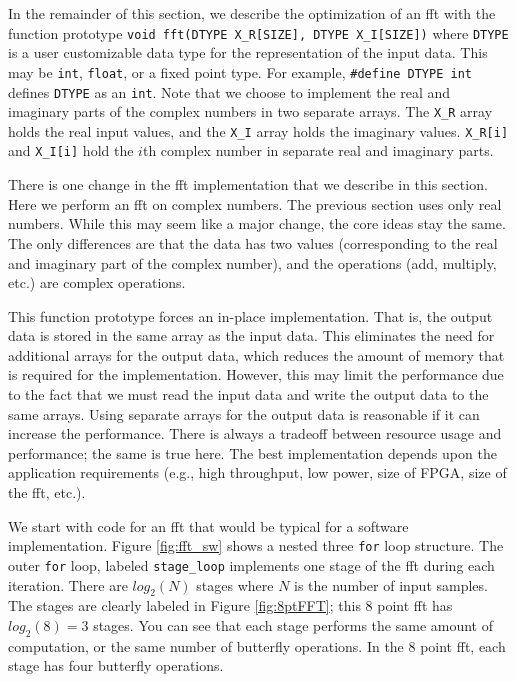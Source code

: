 In the remainder of this section, we describe the optimization of an \gls{fft} with the function prototype \lstinline|void fft(DTYPE X_R[SIZE], DTYPE X_I[SIZE])| where \lstinline|DTYPE| is a user customizable data type for the representation of the input data. This may be \lstinline|int|, \lstinline|float|, or a fixed point type. For example, \lstinline|#define DTYPE int| defines \lstinline|DTYPE| as an \lstinline|int|. Note that we choose to implement the real and imaginary parts of the complex numbers in two separate arrays. The \lstinline|X_R| array holds the real input values, and the \lstinline|X_I| array holds the imaginary values. \lstinline|X_R[i]| and \lstinline|X_I[i]| hold the $i$th complex number in separate real and imaginary parts. 

\begin{aside}
There is one change in the \gls{fft} implementation that we describe in this section. Here we perform an \gls{fft} on complex numbers. The previous section uses only real numbers. While this may seem like a major change, the core ideas stay the same. The only differences are that the data has two values (corresponding to the real and imaginary part of the complex number), and the operations (add, multiply, etc.) are complex operations. 
\end{aside}

This function prototype forces an in-place implementation. That is, the output data is stored in the same array as the input data. This eliminates the need for additional arrays for the output data, which reduces the amount of memory that is required for the implementation. However, this may limit the performance due to the fact that we must read the input data and write the output data to the same arrays. Using separate arrays for the output data is reasonable if it can increase the performance. There is always a tradeoff between resource usage and performance; the same is true here. The best implementation depends upon the application requirements (e.g., high throughput, low power, size of FPGA, size of the \gls{fft}, etc.).


We start with code for an \gls{fft} that would be typical for a software implementation. Figure \ref{fig:fft_sw} shows a nested three \lstinline|for| loop structure. The outer \lstinline|for| loop, labeled \lstinline|stage_loop| implements one stage of the \gls{fft} during each iteration. There are $log_2(N)$ stages where $N$ is the number of input samples. The stages are clearly labeled in Figure \ref{fig:8ptFFT}; this 8 point \gls{fft} has $log_2(8) = 3$ stages. You can see that each stage performs the same amount of computation, or the same number of butterfly operations. In the 8 point \gls{fft}, each stage has four butterfly operations. 

